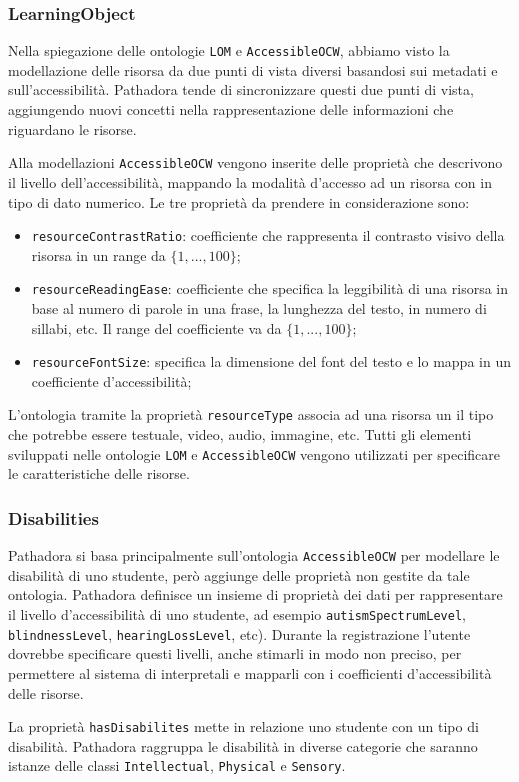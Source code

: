 \subsubsection{LearningObject}
Nella spiegazione delle ontologie \texttt{LOM} e \texttt{AccessibleOCW}, abbiamo visto la modellazione delle risorsa da due punti di vista diversi basandosi sui metadati e sull'accessibilità. Pathadora tende di sincronizzare questi due punti di vista, aggiungendo nuovi concetti nella rappresentazione delle informazioni che riguardano le risorse.

Alla modellazioni \texttt{AccessibleOCW} vengono inserite delle proprietà che descrivono il livello dell'accessibilità, mappando la modalità d'accesso ad un risorsa con in tipo di dato numerico. Le tre proprietà da prendere in considerazione sono:
\begin{itemize}
    \item \texttt{resourceContrastRatio}: coefficiente che rappresenta il contrasto visivo della risorsa in un range da $\{1,...,100\}$;
    \item \texttt{resourceReadingEase}: coefficiente che specifica la leggibilità di una risorsa in base al numero di parole in una frase, la lunghezza del testo, in numero di sillabi, etc. Il range del coefficiente va da $\{1,...,100\}$;
    \item \texttt{resourceFontSize}: specifica la dimensione del font del testo e lo mappa in un coefficiente d'accessibilità;
\end{itemize}

L'ontologia tramite la proprietà \texttt{resourceType} associa ad una risorsa un il tipo che potrebbe essere testuale, video, audio, immagine, etc. Tutti gli elementi sviluppati nelle ontologie \texttt{LOM} e \texttt{AccessibleOCW} vengono utilizzati per specificare le caratteristiche delle risorse.

\subsubsection{Disabilities}
Pathadora si basa principalmente sull'ontologia \texttt{AccessibleOCW} per modellare le disabilità di uno studente, però aggiunge delle proprietà non gestite da tale ontologia. Pathadora definisce un insieme  di proprietà dei dati per rappresentare il livello d'accessibilità di uno studente, ad esempio \texttt{autismSpectrumLevel}, \texttt{blindnessLevel}, \texttt{hearingLossLevel}, etc). Durante la registrazione l'utente dovrebbe specificare questi livelli, anche stimarli in modo non preciso, per permettere al sistema di interpretali e mapparli con i coefficienti d'accessibilità delle risorse.

La proprietà \texttt{hasDisabilites} mette in relazione uno studente con un tipo di disabilità. Pathadora raggruppa le disabilità in diverse categorie che saranno istanze delle classi \texttt{Intellectual}, \texttt{Physical} e \texttt{Sensory}.